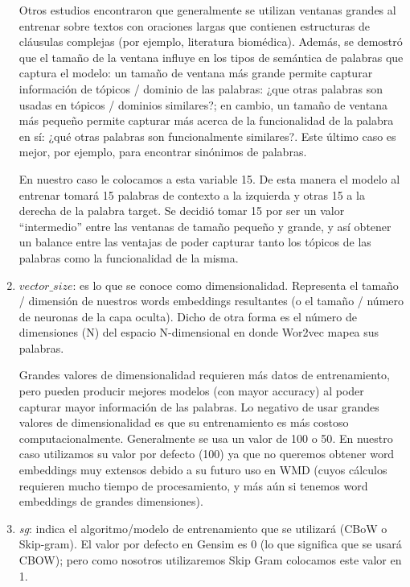 \documentclass[12pt,a4paper]{article}
\begin{document}
\begin{sloppypar}
\begin{enumerate}
Otros estudios\cite{Implem_1,Implem_2} encontraron que generalmente se utilizan ventanas grandes al entrenar sobre textos con oraciones largas que contienen estructuras de cláusulas complejas (por ejemplo, literatura biomédica). Además, se demostró que el tamaño de la ventana influye en los tipos de semántica de palabras que captura el modelo: un tamaño de ventana más grande permite capturar información de tópicos / dominio de las palabras: ¿que otras palabras son usadas en tópicos / dominios similares?; en cambio, un tamaño de ventana más pequeño permite capturar más acerca de la funcionalidad de la palabra en sí: ¿qué otras palabras son funcionalmente similares?. Este último caso es mejor, por ejemplo, para encontrar sinónimos de palabras.

En nuestro caso le colocamos a esta variable 15. De esta manera el modelo al entrenar tomará 15 palabras de contexto a la izquierda y otras 15 a la derecha de la palabra target. Se decidió tomar 15 por ser un valor “intermedio” entre las ventanas de tamaño pequeño y grande, y así obtener un balance entre las ventajas de poder capturar tanto los tópicos de las palabras como la funcionalidad de la misma. 

\item \textit{$vector\_size$}: es lo que se conoce como dimensionalidad. Representa el tamaño / dimensión de nuestros words embeddings resultantes (o el tamaño / número de neuronas de la capa oculta). Dicho de otra forma es el número de dimensiones (N) del espacio N-dimensional en donde Wor2vec mapea sus palabras. 

Grandes valores de dimensionalidad requieren más datos de entrenamiento, pero pueden producir mejores modelos (con mayor accuracy) al poder capturar mayor información de las palabras. Lo negativo de usar grandes valores de dimensionalidad es que su entrenamiento es más costoso computacionalmente\cite{Implem_2}. Generalmente se usa un valor de 100 o 50\cite{NLP_26}. En nuestro caso utilizamos su valor por defecto (100) ya que no queremos obtener word embeddings muy extensos debido a su futuro uso en WMD (cuyos cálculos requieren mucho tiempo de procesamiento, y más aún si tenemos word embeddings de grandes dimensiones).  

\item \textit{sg}: indica el algoritmo/modelo de entrenamiento que se utilizará (CBoW o Skip-gram). El valor por defecto en Gensim es 0 (lo que significa que se usará CBOW); pero como nosotros utilizaremos Skip Gram colocamos este valor en 1.


\end{enumerate}
\end{sloppypar}
\end{document}
